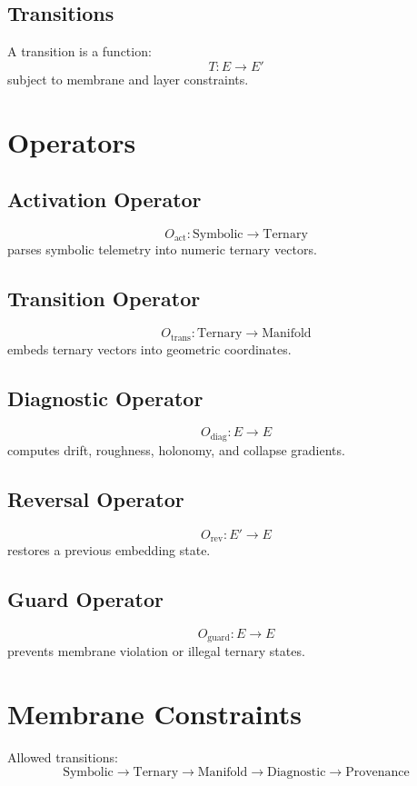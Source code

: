 \documentclass[12pt]{article}
\begin{document}
\subsection{Transitions}
A transition is a function:
\[
T : E \rightarrow E'
\]
subject to membrane and layer constraints.

\section{Operators}

\subsection{Activation Operator}
\[
O_{\text{act}} : \text{Symbolic} \rightarrow \text{Ternary}
\]
parses symbolic telemetry into numeric ternary vectors.

\subsection{Transition Operator}
\[
O_{\text{trans}} : \text{Ternary} \rightarrow \text{Manifold}
\]
embeds ternary vectors into geometric coordinates.

\subsection{Diagnostic Operator}
\[
O_{\text{diag}} : E \rightarrow E
\]
computes drift, roughness, holonomy, and collapse gradients.

\subsection{Reversal Operator}
\[
O_{\text{rev}} : E' \rightarrow E
\]
restores a previous embedding state.

\subsection{Guard Operator}
\[
O_{\text{guard}} : E \rightarrow E
\]
prevents membrane violation or illegal ternary states.

\section{Membrane Constraints}

Allowed transitions:
\[
\text{Symbolic} \rightarrow \text{Ternary} \rightarrow
\text{Manifold} \rightarrow \text{Diagnostic} \rightarrow
\text{Provenance}
\]
\end{document}
